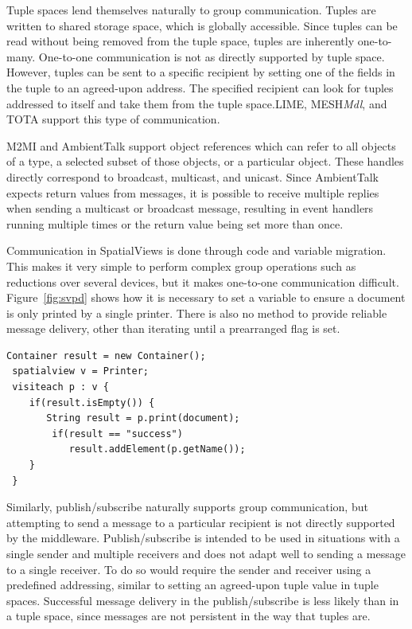 Tuple spaces lend themselves naturally to group communication. Tuples are written to shared storage space, which is globally accessible. Since tuples can be read without being removed from the tuple space, tuples are inherently one-to-many. One-to-one communication is not as directly supported by tuple space. However, tuples can be sent to a specific recipient by setting one of the fields in the tuple to an agreed-upon address. The specified recipient can look for tuples addressed to itself and take them from the tuple space.LIME, MESH\textit{Mdl}, and TOTA support this type of communication. 

M2MI and AmbientTalk support object references which can refer to all objects of a type, a selected subset of those objects, or a particular object. These handles directly correspond to broadcast, multicast, and unicast. Since AmbientTalk expects return values from messages, it is possible to receive multiple replies when sending a multicast or broadcast message, resulting in event handlers running multiple times or the return value being set more than once.

Communication in SpatialViews is done through code and variable migration. This makes it very simple to perform complex group operations such as reductions over several devices, but it makes one-to-one communication difficult. Figure~\ref{fig:svpd} shows how it is necessary to set a variable to ensure a document is only printed by a single printer. There is also no method to provide reliable message delivery, other than iterating until a prearranged flag is set.

\begin{lstlisting}[caption={Printer Discovery in SpatialViews}, label={fig:svpd}]
 Container result = new Container();
 spatialview v = Printer;
 visiteach p : v {
    if(result.isEmpty()) {
       String result = p.print(document);
	    if(result == "success")
	       result.addElement(p.getName());
    }
 }
\end{lstlisting}

Similarly, publish/subscribe naturally supports group communication, but attempting to send a message to a particular recipient is not directly supported by the middleware. Publish/subscribe is intended to be used in situations with a single sender and multiple receivers and does not adapt well to sending a message to a single receiver. To do so would require the sender and receiver using a predefined addressing, similar to setting an agreed-upon tuple value in tuple spaces. Successful message delivery in the publish/subscribe is less likely than in a tuple space, since messages are not persistent in the way that tuples are.

